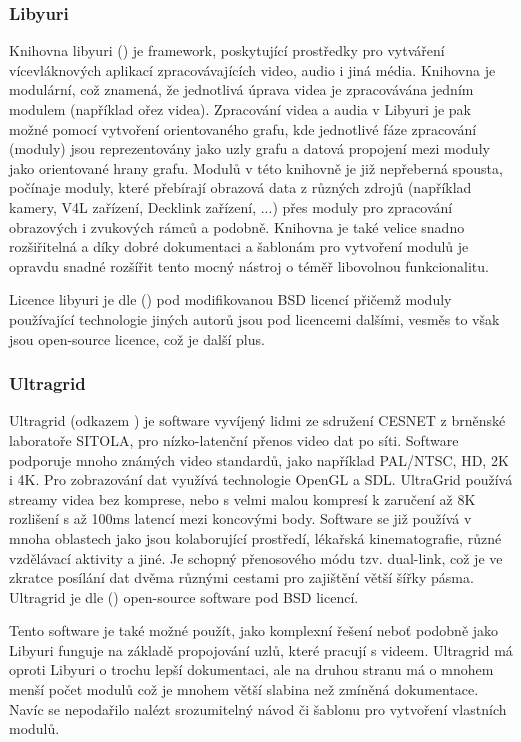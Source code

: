 \documentclass[thesis=M,czech]{FITthesis}[2012/06/26]
\begin{document}
\subsubsection{Libyuri} \label{subsubsec:analyza_reseni_yuri}
Knihovna libyuri (\cite{yuri}) je framework, poskytující prostředky pro vytváření vícevláknových aplikací zpracovávajících video, audio i jiná média. Knihovna je modulární, což znamená, že jednotlivá úprava videa je zpracovávána jedním modulem (například ořez videa). Zpracování videa a audia v Libyuri je pak možné pomocí vytvoření orientovaného grafu, kde jednotlivé fáze zpracování (moduly) jsou reprezentovány jako uzly grafu a datová propojení mezi moduly jako orientované hrany grafu. Modulů v této knihovně je již nepřeberná spousta, počínaje moduly, které přebírají obrazová data z různých zdrojů (například kamery, V4L zařízení, Decklink zařízení, ...) přes moduly pro zpracování obrazových i zvukových rámců a podobně. Knihovna je také velice snadno rozšiřitelná a díky dobré dokumentaci a šablonám pro vytvoření modulů je opravdu snadné rozšířit tento mocný nástroj o téměř libovolnou funkcionalitu.

	Licence libyuri je dle (\cite{yuri}) pod modifikovanou BSD licencí přičemž moduly používající technologie jiných autorů jsou pod licencemi dalšími, vesměs to však jsou open-source licence, což je další plus.

\subsubsection{Ultragrid} \label{subsubsec:analyza_reseni_ultragrid}
Ultragrid (odkazem \cite{ultragrid_web}) je software vyvíjený lidmi ze sdružení CESNET z brněnské laboratoře SITOLA, pro nízko-latenční přenos video dat po síti. Software podporuje mnoho známých video standardů, jako například PAL/NTSC, HD, 2K i 4K. Pro zobrazování dat využívá technologie OpenGL a SDL. UltraGrid používá streamy videa bez komprese, nebo s velmi malou kompresí k zaručení až 8K rozlišení s až 100ms latencí mezi koncovými body. Software se již používá v mnoha oblastech jako jsou kolaborující prostředí, lékařská kinematografie, různé vzdělávací aktivity a jiné. Je schopný přenosového módu tzv. dual-link, což je ve zkratce posílání dat dvěma různými cestami pro zajištění větší šířky pásma. Ultragrid je dle (\cite{ultragrid_wiki}) open-source software pod BSD licencí.
	
	Tento software je také možné použít, jako komplexní řešení neboť podobně jako Libyuri funguje na základě propojování uzlů, které pracují s videem. Ultragrid má oproti Libyuri o trochu lepší dokumentaci, ale na druhou stranu má o mnohem menší počet modulů což je mnohem větší slabina než zmíněná dokumentace. Navíc se nepodařilo nalézt srozumitelný návod či šablonu pro vytvoření vlastních modulů.
\end{document}
